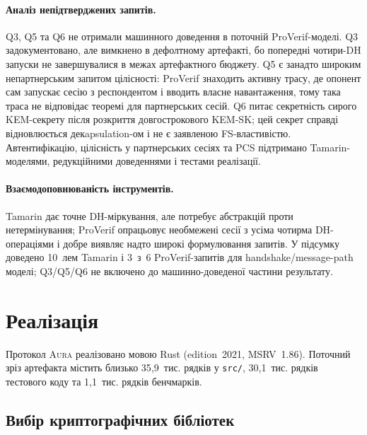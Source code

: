 \documentclass[11pt,a4paper]{article}
\theoremstyle{definition}
\newcommand{\Aura}{\mbox{\normalfont\scshape Aura}}
\begin{document}
\paragraph{Аналіз непідтверджених запитів.}
Q3, Q5 та Q6 не отримали машинного доведення в поточній ProVerif-моделі.
Q3 задокументовано, але вимкнено в дефолтному артефакті, бо попередні
чотири-DH запуски не завершувалися в межах артефактного бюджету. Q5 є занадто
широким непартнерським запитом цілісності: ProVerif знаходить активну
трасу, де опонент сам запускає сесію з респондентом і вводить власне
навантаження, тому така траса не відповідає теоремі для партнерських
сесій. Q6 питає секретність сирого KEM-секрету після розкриття
довгострокового KEM-SK; цей секрет справді відновлюється декapsulation-ом
і не є заявленою FS-властивістю. Автентифікацію, цілісність у партнерських
сесіях та PCS підтримано Tamarin-моделями, редукційними доведеннями і тестами
реалізації.

\paragraph{Взаємодоповнюваність інструментів.}
Tamarin дає точне DH-міркування, але потребує абстракцій проти
нетермінування; ProVerif опрацьовує необмежені сесії з усіма
чотирма DH-операціями і добре виявляє надто широкі формулювання запитів.
У підсумку доведено 10~лем Tamarin і 3~з~6 ProVerif-запитів для
handshake/message-path моделі; Q3/Q5/Q6 не включено до
машинно-доведеної частини результату.

\section{Реалізація}\label{sec:implementation}

Протокол \Aura{} реалізовано мовою Rust (edition~2021, MSRV~1.86).
Поточний зріз артефакта містить близько 35{,}9~тис. рядків у
\texttt{src/}, 30{,}1~тис. рядків тестового коду та 1{,}1~тис. рядків
бенчмарків.

\subsection{Вибір криптографічних бібліотек}\label{sec:libs}
\end{document}
